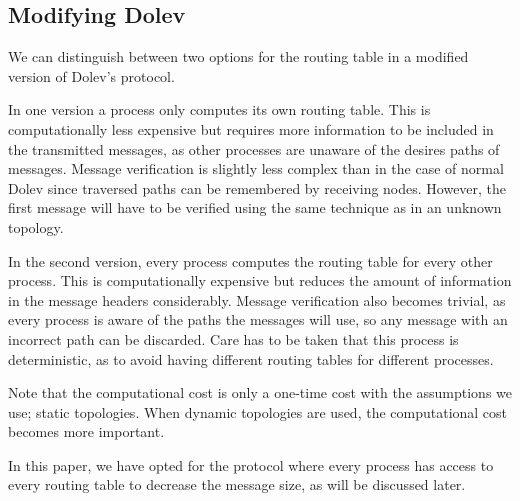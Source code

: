 \subsection{Modifying Dolev}
\label{contr:modifying-dolev}

We can distinguish between two options for the routing table in a modified version of Dolev's protocol.

In one version a process only computes its own routing table. This is computationally less expensive but requires more information to be included in the transmitted messages, as other processes are unaware of the desires paths of messages. Message verification is slightly less complex than in the case of normal Dolev since traversed paths can be remembered by receiving nodes. However, the first message will have to be verified using the same technique as in an unknown topology. 

In the second version, every process computes the routing table for every other process. This is computationally expensive but reduces the amount of information in the message headers considerably. Message verification also becomes trivial, as every process is aware of the paths the messages will use, so any message with an incorrect path can be discarded. Care has to be taken that this process is deterministic, as to avoid having different routing tables for different processes.

Note that the computational cost is only a one-time cost with the assumptions we use; static topologies. When dynamic topologies are used, the computational cost becomes more important. 

In this paper, we have opted for the protocol where every process has access to every routing table to decrease the message size, as will be discussed later.



